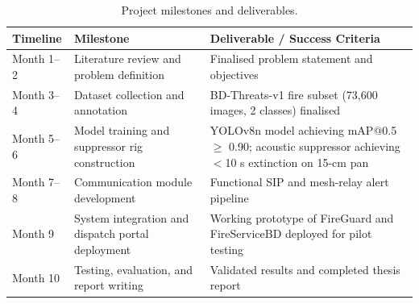 \begin{table}[H]
\centering
\caption{Project milestones and deliverables.}
\label{tab:project_milestones}
\renewcommand{\arraystretch}{1.3}

\begin{tabularx}{\textwidth}{|p{2.8cm}|p{6.3cm}|X|}
\hline
\textbf{Timeline} &
\textbf{Milestone} &
\textbf{Deliverable / Success Criteria} \\
\hline

Month 1--2 &
Literature review and problem definition &
Finalised problem statement and objectives \\
\hline

Month 3--4 &
Dataset collection and annotation &
BD-Threats-v1 fire subset (73{,}600 images, 2 classes) finalised \\
\hline

Month 5--6 &
Model training and suppressor rig construction &
YOLOv8n model achieving mAP@0.5 $\geq$ 0.90; acoustic suppressor achieving $<$10 s extinction on 15-cm pan \\
\hline

Month 7--8 &
Communication module development &
Functional SIP and mesh-relay alert pipeline \\
\hline

Month 9 &
System integration and dispatch portal deployment &
Working prototype of FireGuard and FireServiceBD deployed for pilot testing \\
\hline

Month 10 &
Testing, evaluation, and report writing &
Validated results and completed thesis report \\
\hline

\end{tabularx}
\end{table}


